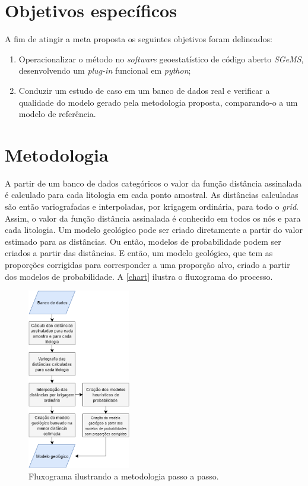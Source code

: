 \section{Objetivos específicos}

A fim de atingir a meta proposta os seguintes objetivos foram delineados:
\begin{enumerate}
\item Operacionalizar o método no \textit{software} geoestatístico de código aberto \textit{SGeMS}, desenvolvendo um \textit{plug-in} funcional em \textit{python};
\item Conduzir um estudo de caso em um banco de dados real e verificar a qualidade do modelo gerado pela metodologia proposta, comparando-o a um modelo de referência.
\end{enumerate}

\section{Metodologia}

A partir de um banco de dados categóricos o valor da função distância assinalada é calculado para cada litologia em cada ponto amostral. As distâncias calculadas são então variografadas e interpoladas, por krigagem ordinária, para todo o \textit{grid}. Assim, o valor da função distância assinalada é conhecido em todos os nós e para cada litologia. Um modelo geológico pode ser criado diretamente a partir do valor estimado para as distâncias. Ou então, modelos de probabilidade podem ser criados a partir das distâncias. E então, um modelo geológico, que tem as proporções corrigidas para corresponder a uma proporção alvo, criado a partir dos modelos de probabilidade. A \autoref{chart} ilustra o fluxograma do processo. 

\begin{figure}[!htb]
	\caption{\label{chart}Fluxograma ilustrando a metodologia passo a passo.}
	\begin{center}
		\includegraphics[width=0.4\textwidth]{introducao/chart1}
	\end{center}
\end{figure}

